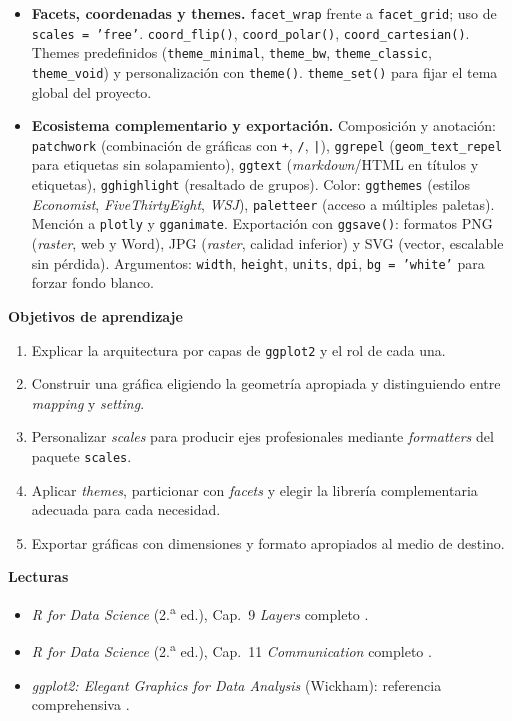 \documentclass[11pt,letterpaper]{article}
\begin{document}
\begin{itemize}[leftmargin=*, itemsep=2pt]
    \item \textbf{Facets, coordenadas y themes.} \texttt{facet\_wrap} frente a \texttt{facet\_grid}; uso de \texttt{scales = 'free'}. \texttt{coord\_flip()}, \texttt{coord\_polar()}, \texttt{coord\_cartesian()}. Themes predefinidos (\texttt{theme\_minimal}, \texttt{theme\_bw}, \texttt{theme\_classic}, \texttt{theme\_void}) y personalización con \texttt{theme()}. \texttt{theme\_set()} para fijar el tema global del proyecto.
    \item \textbf{Ecosistema complementario y exportación.} Composición y anotación: \texttt{patchwork} (combinación de gráficas con \texttt{+}, \texttt{/}, \texttt{|}), \texttt{ggrepel} (\texttt{geom\_text\_repel} para etiquetas sin solapamiento), \texttt{ggtext} (\textit{markdown}/HTML en títulos y etiquetas), \texttt{gghighlight} (resaltado de grupos). Color: \texttt{ggthemes} (estilos \textit{Economist}, \textit{FiveThirtyEight}, \textit{WSJ}), \texttt{paletteer} (acceso a múltiples paletas). Mención a \texttt{plotly} y \texttt{gganimate}. Exportación con \texttt{ggsave()}: formatos PNG (\textit{raster}, web y Word), JPG (\textit{raster}, calidad inferior) y SVG (vector, escalable sin pérdida). Argumentos: \texttt{width}, \texttt{height}, \texttt{units}, \texttt{dpi}, \texttt{bg = 'white'} para forzar fondo blanco.
\end{itemize}

\medskip
\noindent\textbf{Objetivos de aprendizaje}
\begin{enumerate}[leftmargin=*, itemsep=1pt]
    \item Explicar la arquitectura por capas de \texttt{ggplot2} y el rol de cada una.
    \item Construir una gráfica eligiendo la geometría apropiada y distinguiendo entre \textit{mapping} y \textit{setting}.
    \item Personalizar \textit{scales} para producir ejes profesionales mediante \textit{formatters} del paquete \texttt{scales}.
    \item Aplicar \textit{themes}, particionar con \textit{facets} y elegir la librería complementaria adecuada para cada necesidad.
    \item Exportar gráficas con dimensiones y formato apropiados al medio de destino.
\end{enumerate}

\medskip
\noindent\textbf{Lecturas}
\begin{itemize}[leftmargin=*, itemsep=1pt]
    \item \textit{R for Data Science} (2.\textsuperscript{a} ed.), Cap.\ 9 \textit{Layers} completo \cite{wickham2023r4ds}.
    \item \textit{R for Data Science} (2.\textsuperscript{a} ed.), Cap.\ 11 \textit{Communication} completo \cite{wickham2023r4ds}.
    \item \textit{ggplot2: Elegant Graphics for Data Analysis} (Wickham): referencia comprehensiva \cite{wickham2016ggplot2}.
\end{itemize}
\end{document}
